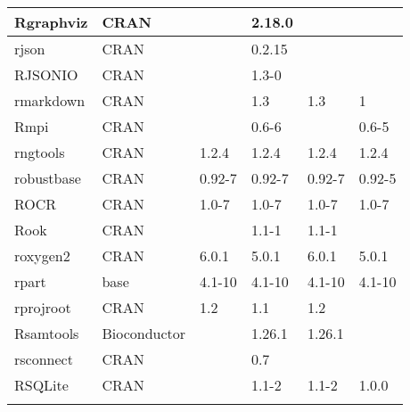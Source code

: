 \begin{longtable}{|llllll|}
Rgraphviz                     & CRAN                      &             & 2.18.0      &                &                   \\ \hline \rowcolor{gray!25}
rjson                         & CRAN                      &             & 0.2.15      &                &                  \\ \hline
RJSONIO                       & CRAN                      &             & 1.3-0       &                &                   \\ \hline \rowcolor{gray!25}
rmarkdown                     & CRAN                      &             & 1.3         & 1.3            & 1                \\ \hline
Rmpi                          & CRAN                      &             & 0.6-6       &                & 0.6-5             \\ \hline \rowcolor{gray!25}
rngtools                      & CRAN                      & 1.2.4       & 1.2.4       & 1.2.4          & 1.2.4            \\ \hline
robustbase                    & CRAN                      & 0.92-7      & 0.92-7      & 0.92-7         & 0.92-5            \\ \hline \rowcolor{gray!25}
ROCR                          & CRAN                      & 1.0-7       & 1.0-7       & 1.0-7          & 1.0-7            \\ \hline
Rook                          & CRAN                      &             & 1.1-1       & 1.1-1          &                   \\ \hline \rowcolor{gray!25}
roxygen2                      & CRAN                      & 6.0.1       & 5.0.1       & 6.0.1          & 5.0.1            \\ \hline
rpart                         & base                      & 4.1-10      & 4.1-10      & 4.1-10         & 4.1-10            \\ \hline \rowcolor{gray!25}
rprojroot                     & CRAN                      & 1.2         & 1.1         & 1.2            &                  \\ \hline
Rsamtools                     & Bioconductor              &             & 1.26.1      & 1.26.1         &                   \\ \hline \rowcolor{gray!25}
rsconnect                     & CRAN                      &             & 0.7         &                &                  \\ \hline
RSQLite                       & CRAN                      &             & 1.1-2       & 1.1-2          & 1.0.0             \\ \hline \rowcolor{gray!25}

\end{longtable}

